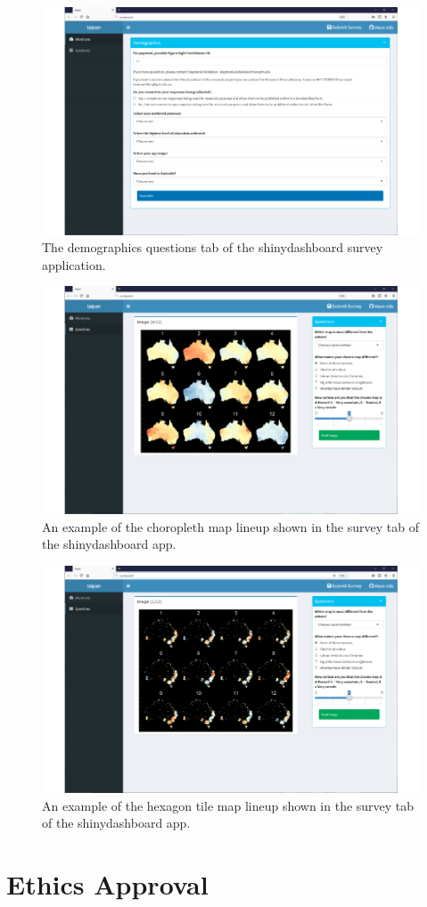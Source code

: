 \documentclass{monashthesis}
\begin{document}
\begin{figure}[H]
\centering
\includegraphics[width=16cm]{lineups/survey-demogs-1.pdf}
\caption{\label{fig:survey-demogs}The demographics questions tab of the shinydashboard survey application.}
\end{figure}

\begin{figure}[H]
\centering
\includegraphics[width=16cm]{lineups/survey-choro-1.pdf}
\caption{\label{fig:survey-choro}An example of the choropleth map lineup shown in the survey tab of the shinydashboard app.}
\end{figure}

\begin{figure}[H]
\centering
\includegraphics[width=16cm]{lineups/survey-hex-1.pdf}
\caption{\label{fig:survey-hex}An example of the hexagon tile map lineup shown in the survey tab of the shinydashboard app.}
\end{figure}

\hypertarget{ethics-approval}{%
\section{Ethics Approval}\label{ethics-approval}}


\end{document}
